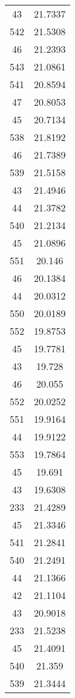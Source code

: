 \begin{tabular}[c]{|c|c|}
        43&   21.7337\\
       542&   21.5308\\
        46&   21.2393\\
       543&   21.0861\\
       541&   20.8594\\
        47&   20.8053\\
        45&   20.7134\\
       538&   21.8192\\
        46&   21.7389\\
       539&   21.5158\\
        43&   21.4946\\
        44&   21.3782\\
       540&   21.2134\\
        45&   21.0896\\
       551&    20.146\\
        46&   20.1384\\
        44&   20.0312\\
       550&   20.0189\\
       552&   19.8753\\
        45&   19.7781\\
        43&    19.728\\
        46&    20.055\\
       552&   20.0252\\
       551&   19.9164\\
        44&   19.9122\\
       553&   19.7864\\
        45&    19.691\\
        43&   19.6308\\
       233&   21.4289\\
        45&   21.3346\\
       541&   21.2841\\
       540&   21.2491\\
        44&   21.1366\\
        42&   21.1104\\
        43&   20.9018\\
       233&   21.5238\\
        45&   21.4091\\
       540&    21.359\\
       539&   21.3444\\

\end{tabular}
